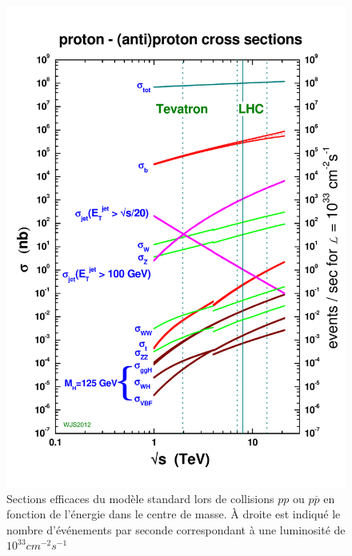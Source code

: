   \begin{figure}[!htb]
    \begin{center} 
      \includegraphics[scale=0.40]{./figures/crosssections2012_v5_LHC.pdf}
      \caption{Sections efficaces du mod\`ele standard lors de collisions $pp$ ou $p\overline{p}$ en fonction de l'\'energie dans le centre de masse. \`A droite est indiqu\'e le nombre d'\'ev\'enements par seconde correspondant \`a une luminosit\'e de $10^{33}cm^{-2}s^{-1}$}
     \label{fig:sect_eff_pp}
     \end{center}
  \end{figure}
   
   \medskip
   
